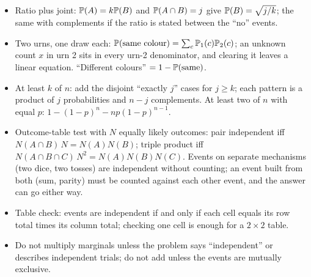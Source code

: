 \begin{itemize}[nosep]
\item Ratio plus joint: $\mathbb{P}(A) = k\mathbb{P}(B)$ and $\mathbb{P}(A \cap B) = j$ give $\mathbb{P}(B) = \sqrt{j/k}$; the same with complements if the ratio is stated between the ``no'' events.
\item Two urns, one draw each: $\mathbb{P}(\text{same colour}) = \sum_c \mathbb{P}_1(c)\mathbb{P}_2(c)$; an unknown count $x$ in urn 2 sits in every urn-2 denominator, and clearing it leaves a linear equation. ``Different colours'' $= 1 - \mathbb{P}(\text{same})$.
\item At least $k$ of $n$: add the disjoint ``exactly $j$'' cases for $j \ge k$; each pattern is a product of $j$ probabilities and $n-j$ complements. At least two of $n$ with equal $p$: $1 - (1-p)^n - np(1-p)^{n-1}$.
\item Outcome-table test with $N$ equally likely outcomes: pair independent iff $N(A \cap B)\,N = N(A)N(B)$; triple product iff $N(A \cap B \cap C)\,N^2 = N(A)N(B)N(C)$. Events on separate mechanisms (two dice, two tosses) are independent without counting; an event built from both (sum, parity) must be counted against each other event, and the answer can go either way.
\item Table check: events are independent if and only if each cell equals its row total times its column total; checking one cell is enough for a $2 \times 2$ table.
\item Do not multiply marginals unless the problem says ``independent'' or describes independent trials; do not add unless the events are mutually exclusive.
\end{itemize}
